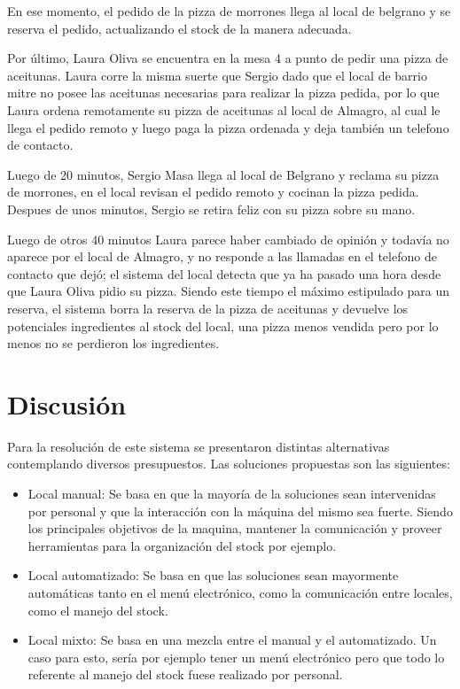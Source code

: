 \documentclass[a4paper,10pt]{article}
\begin{document}
En ese momento, el pedido de la pizza de morrones llega al local de belgrano y se reserva el pedido, actualizando el stock de la manera adecuada.

Por \'ultimo, Laura Oliva se encuentra en la mesa 4 a punto de pedir una pizza de aceitunas. Laura corre la misma suerte que Sergio dado que el local
de barrio mitre no posee las aceitunas necesarias para realizar la pizza pedida, por lo que Laura ordena remotamente su pizza de aceitunas al local de
Almagro, al cual le llega el pedido remoto y luego paga la pizza ordenada y deja tambi\'en un telefono de contacto.


Luego de 20 minutos, Sergio Masa llega al local de Belgrano y reclama su pizza de morrones, en el local revisan el pedido remoto y cocinan la pizza
pedida. Despues de unos minutos, Sergio se retira feliz con su pizza sobre su mano. 

Luego de otros 40 minutos Laura parece haber cambiado de opini\'on y todav\'ia no aparece por el local de Almagro, y no responde a las llamadas en el telefono de contacto que dej\'o;
el sistema del local detecta que ya ha pasado una hora desde que Laura Oliva pidio su pizza. Siendo este
tiempo el m\'aximo estipulado para un reserva, el sistema borra la reserva de la pizza de aceitunas y devuelve los potenciales ingredientes
al stock del local, una pizza menos vendida pero por lo menos no se perdieron los ingredientes.



\newpage


\section*{Discusi\'on}

Para la resoluci\'on de este sistema se presentaron distintas alternativas contemplando diversos presupuestos. Las soluciones propuestas son las siguientes:
\begin{itemize}
\item Local manual: Se basa en que la mayor\'ia de la soluciones sean intervenidas por personal y que la interacci\'on con la m\'aquina del mismo sea fuerte.
Siendo los principales objetivos de la maquina, mantener la comunicaci\'on y proveer herramientas para la organizaci\'on del stock por ejemplo.
\item Local automatizado: Se basa en que las soluciones sean mayormente autom\'aticas tanto en el men\'u electr\'onico, como la comunicaci\'on entre locales, como el manejo del stock.
\item Local mixto: Se basa en una mezcla entre el manual y el automatizado. Un caso para esto, ser\'ia por ejemplo tener un men\'u electr\'onico pero que todo lo referente al manejo del stock fuese realizado por personal.
\end{itemize}
\end{document}
